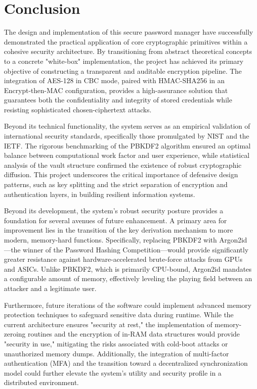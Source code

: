\chapter{Conclusion}
\label{ch:conclusion}

The design and implementation of this secure password manager have successfully demonstrated the practical application of core cryptographic primitives within a cohesive security architecture. By transitioning from abstract theoretical concepts to a concrete "white-box" implementation, the project has achieved its primary objective of constructing a transparent and auditable encryption pipeline. The integration of AES-128 in CBC mode, paired with HMAC-SHA256 in an Encrypt-then-MAC configuration, provides a high-assurance solution that guarantees both the confidentiality and integrity of stored credentials while resisting sophisticated chosen-ciphertext attacks.

Beyond its technical functionality, the system serves as an empirical validation of international security standards, specifically those promulgated by NIST and the IETF. The rigorous benchmarking of the PBKDF2 algorithm ensured an optimal balance between computational work factor and user experience, while statistical analysis of the vault structure confirmed the existence of robust cryptographic diffusion. This project underscores the critical importance of defensive design patterns, such as key splitting and the strict separation of encryption and authentication layers, in building resilient information systems.

Beyond its development, the system's robust security posture provides a foundation for several avenues of future enhancement. A primary area for improvement lies in the transition of the key derivation mechanism to more modern, memory-hard functions. Specifically, replacing PBKDF2 with Argon2id—the winner of the Password Hashing Competition—would provide significantly greater resistance against hardware-accelerated brute-force attacks from GPUs and ASICs. Unlike PBKDF2, which is primarily CPU-bound, Argon2id mandates a configurable amount of memory, effectively leveling the playing field between an attacker and a legitimate user.

Furthermore, future iterations of the software could implement advanced memory protection techniques to safeguard sensitive data during runtime. While the current architecture ensures "security at rest," the implementation of memory-zeroing routines and the encryption of in-RAM data structures would provide "security in use," mitigating the risks associated with cold-boot attacks or unauthorized memory dumps. Additionally, the integration of multi-factor authentication (MFA) and the transition toward a decentralized synchronization model could further elevate the system's utility and security profile in a distributed environment.
